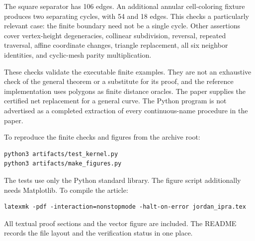 The square separator has 106 edges. An additional annular
cell-coloring fixture produces two separating cycles, with
54 and 18 edges. This checks a particularly relevant case:
the finite boundary need not be a single cycle.
Other assertions cover vertex-height degeneracies, collinear
subdivision, reversal, repeated traversal, affine coordinate
changes, triangle replacement, all six neighbor identities,
and cyclic-mesh parity multiplication.

These checks validate the executable finite examples. They
are not an exhaustive check of the general theorem or a
substitute for its proof, and the reference implementation
uses polygons as finite distance oracles. The paper supplies
the certified net replacement for a general curve. The
Python program is not advertised as a completed extraction
of every continuous-name procedure in the paper.

To reproduce the finite checks and figures from the archive root:
\begin{lstlisting}
python3 artifacts/test_kernel.py
python3 artifacts/make_figures.py
\end{lstlisting}
The tests use only the Python standard library. The figure
script additionally needs Matplotlib. To compile the article:
\begin{lstlisting}
latexmk -pdf -interaction=nonstopmode -halt-on-error jordan_ipra.tex
\end{lstlisting}
All textual proof sections and the vector figure are included.
The README records the file layout and the verification
status in one place.
